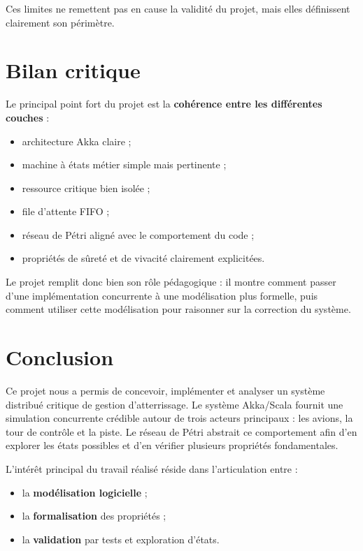 \documentclass[11pt,a4paper]{article}
\begin{document}
Ces limites ne remettent pas en cause la validité du projet, mais elles définissent clairement son périmètre.

\section{Bilan critique}

Le principal point fort du projet est la \textbf{cohérence entre les différentes couches} :
\begin{itemize}
    \item architecture Akka claire ;
    \item machine à états métier simple mais pertinente ;
    \item ressource critique bien isolée ;
    \item file d'attente FIFO ;
    \item réseau de Pétri aligné avec le comportement du code ;
    \item propriétés de sûreté et de vivacité clairement explicitées.
\end{itemize}

Le projet remplit donc bien son rôle pédagogique : il montre comment passer d'une implémentation concurrente à une modélisation plus formelle, puis comment utiliser cette modélisation pour raisonner sur la correction du système.

\section{Conclusion}

Ce projet nous a permis de concevoir, implémenter et analyser un système distribué critique de gestion d'atterrissage. Le système Akka/Scala fournit une simulation concurrente crédible autour de trois acteurs principaux : les avions, la tour de contrôle et la piste. Le réseau de Pétri abstrait ce comportement afin d'en explorer les états possibles et d'en vérifier plusieurs propriétés fondamentales.

L'intérêt principal du travail réalisé réside dans l'articulation entre :
\begin{itemize}
    \item la \textbf{modélisation logicielle} ;
    \item la \textbf{formalisation} des propriétés ;
    \item la \textbf{validation} par tests et exploration d'états.
\end{itemize}
\end{document}
